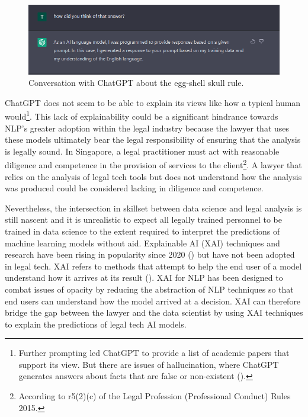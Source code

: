 \begin{figure}[!ht]
	\centering
	\includegraphics[width=1\linewidth]{figures/chatgpt2.png}
	\caption{Conversation with ChatGPT about the egg-shell skull rule.}   
  \label{fig:chatgpt2}
\end{figure}

ChatGPT does not seem to be able to explain its views like how a typical human would\footnote{Further prompting led ChatGPT to provide a list of academic papers that support its view. But there are issues of hallucination, where ChatGPT generates answers about facts that are false or non-existent (\cite{alkaissi2023}).}. This lack of explainability could be a significant hindrance towards NLP's greater adoption within the legal industry because the lawyer that uses these models ultimately bear the legal responsibility of ensuring that the analysis is legally sound. In Singapore, a legal practitioner must act with reasonable diligence and competence in the provision of services to the client\footnote{According to r5(2)(c) of the Legal Profession (Professional Conduct) Rules 2015.}. A lawyer that relies on the analysis of legal tech tools but does not understand how the analysis was produced could be considered lacking in diligence and competence.

Nevertheless, the intersection in skillset between data science and legal analysis is still nascent and it is unrealistic to expect all legally trained personnel to be trained in data science to the extent required to interpret the predictions of machine learning models without aid. Explainable AI (XAI) techniques and research have been rising in popularity since 2020 (\cite{linardatos2020}) but have not been adopted in legal tech. XAI refers to methods that attempt to help the end user of a model understand how it arrives at its result (\cite{danilevsky2020}). XAI for NLP has been designed to combat issues of opacity by reducing the abstraction of NLP techniques so that end users can understand how the model arrived at a decision. XAI can therefore bridge the gap between the lawyer and the data scientist by using XAI techniques to explain the predictions of legal tech AI models. 

